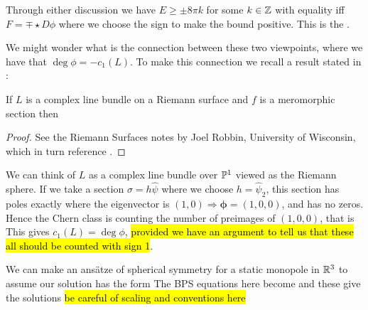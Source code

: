 \documentclass{article}
\begin{document}
Through either discussion we have $E\geq \pm 8\pi k$ for some $k \in \mathbb{Z}$ with equality iff $F=\mp \star D \phi$ where we choose the sign to make the bound positive. This is the .
\begin{remark}
	We might wonder what is the connection between these two viewpoints, where we have that $\deg \phi = -c_1(L)$. To make this connection we recall a result stated in \cite{Babelon2003}:
	\begin{prop}
		If $L$ is a complex line bundle on a Riemann surface and $f$ is a meromorphic section then 
	\end{prop}
\begin{proof}
	See the Riemann Surfaces notes by Joel Robbin, University of Wisconsin, which in turn reference \cite{Griffiths2014}. 
\end{proof}
We can think of $L$ as a complex line bundle over $\mathbb{P}^1$ viewed as the Riemann sphere. If we take a section $\sigma = h \hat{\psi}$ where we choose $h=\hat{\psi}_2$, this section has poles exactly where the eigenvector is $(1,0) \Rightarrow \bm{\phi} = (1,0,0)$, and has no zeros. Hence the Chern class is counting the number of preimages of $(1,0,0)$, that is 
This gives $c_1(L)=\deg \phi$, \hl{provided we have an argument to tell us that these all should be counted with sign 1}. 
\end{remark}

\begin{example}
	We can make an ans\"atze of spherical symmetry for a static monopole in $\mathbb{R}^3$ to assume our solution has the form 
The BPS equations here become 
and these give the solutions
\hl{be careful of scaling and conventions here}
\end{example}
\end{document}
